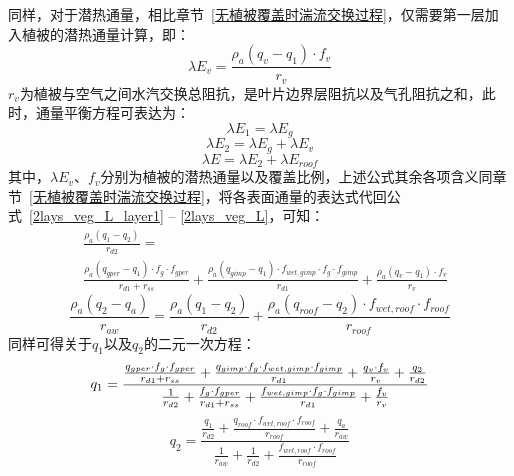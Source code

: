 同样，对于潜热通量，相比章节~\ref{无植被覆盖时湍流交换过程}，仅需要第一层加入植被的潜热通量计算，即：
\begin{equation}
    \lambda E_{v} = \frac{\rho _a \left( q_{v}-q_{1}\right) \cdot f_v}{r_{v}}
\end{equation}
$r_v$为植被与空气之间水汽交换总阻抗，是叶片边界层阻抗以及气孔阻抗之和，此时，通量平衡方程可表达为：
\begin{equation}\label{2lays_veg_L_layer1}
    \lambda E_{1} = \lambda E_{g}
\end{equation}
%
\begin{equation}
    \lambda E_{2} = \lambda E_{g} + \lambda E_{v}
\end{equation}
%
\begin{equation}\label{2lays_veg_L}
    \lambda E = \lambda E_{2} + \lambda E_{roof}
\end{equation}
其中，$\lambda E_{v}$、$f_v$分别为植被的潜热通量以及覆盖比例，上述公式其余各项含义同章节~\ref{无植被覆盖时湍流交换过程}，将各表面通量的表达式代回公式~\ref{2lays_veg_L_layer1} -- \ref{2lays_veg_L}，可知：
\begin{equation}
   \begin{split}
    & \frac{\rho _a \left( q_{1}-q_{2}\right)}{r_{d2}} = \\
    & \frac{\rho _a \left( q_{gper}-q_{1}\right) \cdot f_{g} \cdot f_{gper}}{r_{d1}+r_{ss}} + \frac{\rho _a \left( q_{gimp}-q_{1} \right) \cdot f_{wet,gimp} \cdot f_{g} \cdot f_{gimp}}{r_{d1}} + \frac{\rho _a \left( q_{v}-q_{1}\right) \cdot f_v}{r_{v}}
   \end{split} 
\end{equation}
%
\begin{equation}
    \frac{\rho _a \left( q_{2} - q_a\right)}{r_{aw}} = \frac{\rho _a \left( q_{1} - q_{2}\right)}{r_{d2}} + \frac{\rho _a \left( q_{roof}-q_{2}\right) \cdot f_{wet,roof} \cdot f_{roof}}{r_{roof}}
\end{equation}
同样可得关于$q_{1}$以及$q_{2}$的二元一次方程：
\begin{equation}
    q_{1} = \\
    \frac{\frac{q_{gper} \cdot f_{g} \cdot f_{gper}}{r_{d1} + r_{ss}} + \frac{q_{gimp} \cdot f_{g} \cdot f_{wet,gimp} \cdot f_{gimp}}{r_{d1}} + \frac{q_{v} \cdot f_v}{r_{v}} + \frac{q_{2}}{r_{d2}}}{\frac{1}{r_{d2}} + \frac{f_{g} \cdot f_{gper}}{r_{d1} + r_{ss}} + \frac{f_{wet,gimp} \cdot f_{g} \cdot f_{gimp}}{r_{d1}}+\frac{f_v}{r_{v}}}
\end{equation}
%
\begin{equation}\label{equ_2lays_veg_Q_lay2}
    q_{2} = \frac{\frac{q_{1}}{r_{d2}} + \frac{q_{roof} \cdot f_{wet,roof} \cdot f_{roof}}{r_{roof}} + \frac{q_a}{r_{aw}}}{\frac{1}{r_{aw}} + \frac{1}{r_{d2}} + \frac{f_{wet,roof} \cdot f_{roof}}{r_{roof}}}
\end{equation}
